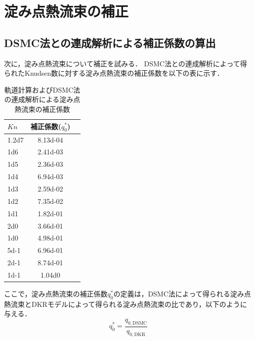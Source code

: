 \section{淀み点熱流束の補正}
\subsection{DSMC法との連成解析による補正係数の算出}
次に，淀み点熱流束について補正を試みる．
DSMC法との連成解析によって得られたKnudsen数に対する淀み点熱流束の補正係数を以下の表に示す．
\begin{table}[H]
\centering
\caption{軌道計算およびDSMC法の連成解析による淀み点熱流束の補正係数}
\begin{tabular}{l|cc}
\hline\hline

$Kn$ & 補正係数($q_0^*$) \\ \hline
\num{1.2d7} &  \num{8.13d-04} \\
\num{1d6  } &  \num{2.41d-03} \\
\num{1d5  } &  \num{2.36d-03} \\
\num{1d4  } &  \num{6.94d-03} \\
\num{1d3  } &  \num{2.59d-02} \\
\num{1d2  } &  \num{7.35d-02} \\
\num{1d1  } &  \num{1.82d-01} \\
\num{2d0  } &  \num{3.66d-01} \\
\num{1d0  } &  \num{4.98d-01} \\
\num{5d-1} &  \num{6.96d-01} \\
\num{2d-1 } &  \num{8.74d-01} \\
\num{1d-1 } &  \num{1.04d0  } \\ \hline\hline
\end{tabular}
\end{table}
ここで，淀み点熱流束の補正係数$q_0^*$の定義は，DSMC法によって得られる淀み点熱流束とDKRモデルによって得られる淀み点熱流束の比であり，以下のように与える．
\begin{equation}
    q_0^* = \dfrac{q_{0,\mathrm{DSMC}}}{q_{0,\mathrm{DKR}}}
\end{equation}


